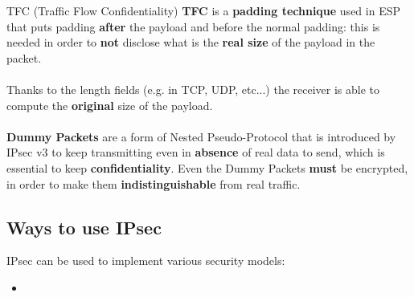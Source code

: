 \begin{quotebox}[colframe=blue!10!white, colback=blue!5!white]{TFC (Traffic Flow Confidentiality)}
    \textbf{TFC} is a \textbf{padding technique} used in ESP that puts padding \textbf{after} the payload and before
    the normal padding: this is needed in order to \textbf{not} disclose what is the \textbf{real size} of the payload in the packet.\\     \\    
    Thanks to the length fields (e.g. in TCP, UDP, etc...) the receiver is able to compute the \textbf{original} size of the payload.\\     \\  
    \textbf{Dummy Packets} are a form of Nested Pseudo-Protocol that is introduced by IPsec v3 to keep
    transmitting even in \textbf{absence} of real data to send, which is essential to keep \textbf{confidentiality}.
    Even the Dummy Packets \textbf{must} be encrypted, in order to make them \textbf{indistinguishable} from
    real traffic.
\end{quotebox}

\subsection{Ways to use IPsec}
IPsec can be used to implement various security models:
\begin{itemize}
    \item 
\end{itemize}